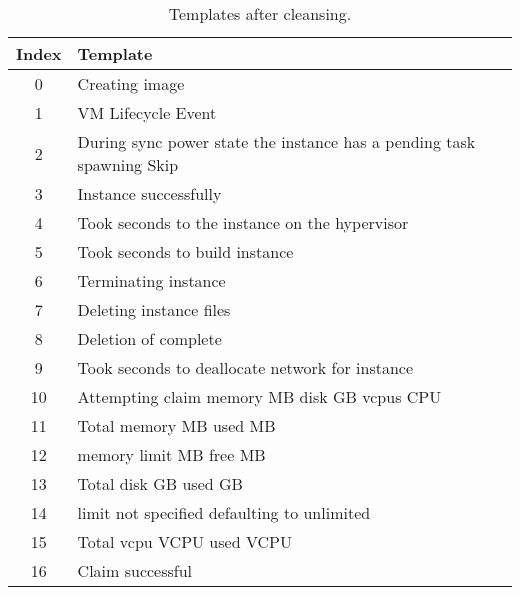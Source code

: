 \begin{table}[ht]
\begin{small}
\centering
\begin{tabular}{ c l } 
\toprule
Index & Template \\
\midrule
0 & Creating image\\
1 & VM  Lifecycle Event\\
2 & During sync power state the instance has a pending task spawning Skip\\
3 & Instance  successfully\\
4 & Took  seconds to  the instance on the hypervisor\\
5 & Took  seconds to build instance\\
6 & Terminating instance\\
7 & Deleting instance files\\
8 & Deletion of complete\\
9 & Took  seconds to deallocate network for instance\\
10 & Attempting claim memory  MB disk  GB vcpus  CPU\\
11 & Total memory  MB used  MB\\
12 & memory limit  MB free  MB\\
13 & Total disk  GB used  GB\\
14 & limit not specified defaulting to unlimited\\
15 & Total vcpu  VCPU used  VCPU\\
16 & Claim successful\\
\bottomrule
\end{tabular}
\caption{Templates after cleansing.}
\label{tab:templates_after_cleansing}
\end{small}
\end{table}

\clearpage
